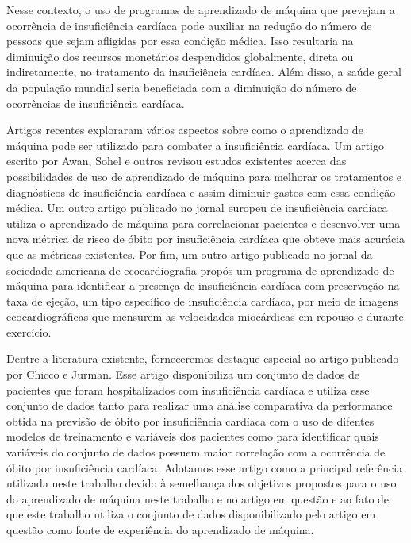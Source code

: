Nesse contexto, o uso de programas de aprendizado de máquina que prevejam a ocorrência de insuficiência cardíaca pode auxiliar na redução do número de pessoas que sejam afligidas por essa condição médica. Isso resultaria na diminuição dos recursos monetários despendidos globalmente, direta ou indiretamente, no tratamento da insuficiência cardíaca. Além disso, a saúde geral da população mundial seria beneficiada com a diminuição do número de ocorrências de insuficiência cardíaca.

Artigos recentes exploraram vários aspectos sobre como o aprendizado de máquina pode ser utilizado para combater a insuficiência cardíaca. Um artigo escrito por Awan, Sohel e outros revisou estudos existentes acerca das possibilidades de uso de aprendizado de máquina para melhorar os tratamentos e diagnósticos de insuficiência cardíaca e assim diminuir gastos com essa condição médica\cite{awan2018}. Um outro artigo publicado no jornal europeu de insuficiência cardíaca utiliza o aprendizado de máquina para correlacionar pacientes e desenvolver uma nova métrica de risco de óbito por insuficiência cardíaca que obteve mais acurácia que as métricas existentes\cite{adler2020}. Por fim, um outro artigo publicado no jornal da sociedade americana de ecocardiografia propós um programa de aprendizado de máquina para identificar a presença de insuficiência cardíaca com preservação na taxa de ejeção, um tipo específico de insuficiência cardíaca, por meio de imagens ecocardiográficas que mensurem as velocidades miocárdicas em repouso e durante exercício\cite{hfpef2018}.

Dentre a literatura existente, forneceremos destaque especial ao artigo publicado por Chicco e Jurman\cite{chicco2020}. Esse artigo disponibiliza um conjunto de dados de pacientes que foram hospitalizados com insuficiência cardíaca\cite{larxel_dataset} e utiliza esse conjunto de dados tanto para realizar uma análise comparativa da performance obtida na previsão de óbito por insuficiência cardíaca com o uso de difentes modelos de treinamento e variáveis dos pacientes como para identificar quais variáveis do conjunto de dados possuem maior correlação com a ocorrência de óbito por insuficiência cardíaca. Adotamos esse artigo como a principal referência utilizada neste trabalho devido à semelhança dos objetivos propostos para o uso do aprendizado de máquina neste trabalho e no artigo em questão e ao fato de que este trabalho utiliza o conjunto de dados disponibilizado pelo artigo em questão como fonte de experiência do aprendizado de máquina.
